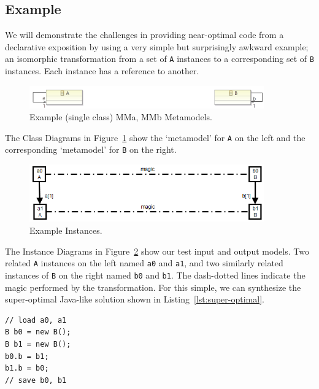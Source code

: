 \documentclass{jot}
\begin{document}
\subsection{Example}

We will demonstrate the challenges in providing near-optimal code from a declarative exposition by using a very simple but surprisingly awkward example; an isomorphic transformation from a set of \verb|A| instances to a corresponding set of \verb|B| instances. Each instance has a reference to another.

\begin{figure}[h]
	\centering
	\includegraphics[width=0.9\textwidth]{MM2TinyIsomorph.png}
	\caption{Example (single class) MMa, MMb Metamodels.}
	\label{fig:MM2TinyIsomorph}
\end{figure}

The Class Diagrams in Figure~\ref{fig:MM2TinyIsomorph} show the `metamodel' for \verb|A| on the left and the corresponding `metamodel' for \verb|B| on the right.

\begin{figure}[h]
	\centering
	\includegraphics[width=0.9\textwidth]{InstancesTinyIsomorph.png}
	\caption{Example Instances.}
	\label{fig:InstancesTinyIsomorph}
\end{figure}

The Instance Diagrams in Figure~\ref{fig:InstancesTinyIsomorph} show our test input and output models. Two related \verb|A| instances on the left named \verb|a0| and \verb|a1|, and two similarly related instances of \verb|B| on the right named \verb|b0| and \verb|b1|. The dash-dotted lines indicate the magic performed by the transformation. For this simple, we can synthesize the super-optimal Java-like solution shown in Listing~\ref{lst:super-optimal}.

\begin{lstlisting}[label=lst:super-optimal,caption=Super-Optimal Example Conversion,captionpos=b]
// load a0, a1
B b0 = new B();
B b1 = new B();
b0.b = b1;
b1.b = b0;
// save b0, b1
\end{lstlisting}
\end{document}
